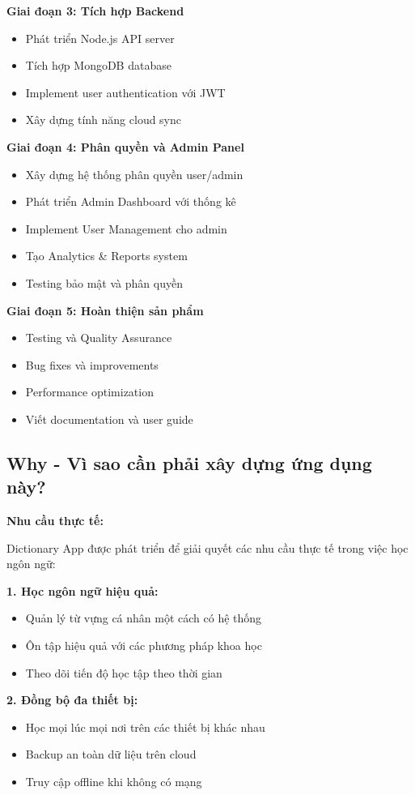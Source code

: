 \documentclass[12pt,a4paper]{article}
\begin{document}
\textbf{Giai đoạn 3: Tích hợp Backend}
\begin{itemize}
    \item Phát triển Node.js API server
    \item Tích hợp MongoDB database
    \item Implement user authentication với JWT
    \item Xây dựng tính năng cloud sync
\end{itemize}

\textbf{Giai đoạn 4: Phân quyền và Admin Panel}
\begin{itemize}
    \item Xây dựng hệ thống phân quyền user/admin
    \item Phát triển Admin Dashboard với thống kê
    \item Implement User Management cho admin
    \item Tạo Analytics \& Reports system
    \item Testing bảo mật và phân quyền
\end{itemize}

\textbf{Giai đoạn 5: Hoàn thiện sản phẩm}
\begin{itemize}
    \item Testing và Quality Assurance
    \item Bug fixes và improvements
    \item Performance optimization
    \item Viết documentation và user guide
\end{itemize}

\subsection{Why - Vì sao cần phải xây dựng ứng dụng này?}

\textbf{Nhu cầu thực tế:}

Dictionary App được phát triển để giải quyết các nhu cầu thực tế trong việc học ngôn ngữ:

\textbf{1. Học ngôn ngữ hiệu quả:}
\begin{itemize}
    \item Quản lý từ vựng cá nhân một cách có hệ thống
    \item Ôn tập hiệu quả với các phương pháp khoa học
    \item Theo dõi tiến độ học tập theo thời gian
\end{itemize}

\textbf{2. Đồng bộ đa thiết bị:}
\begin{itemize}
    \item Học mọi lúc mọi nơi trên các thiết bị khác nhau
    \item Backup an toàn dữ liệu trên cloud
    \item Truy cập offline khi không có mạng
\end{itemize}
\end{document}
